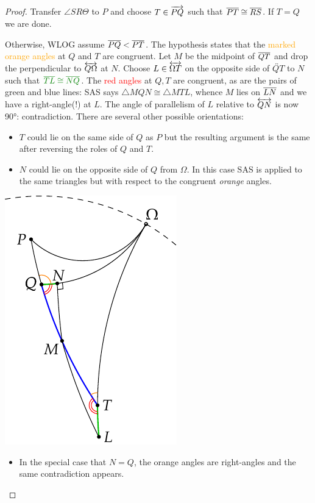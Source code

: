 \begin{proof}
Transfer $\angle SR\Theta$ to $P$ and choose $T\in\overrightarrow{PQ}$ such that $\overline{PT}\cong\overline{RS}$. If $T=Q$ we are done.\par
\begin{minipage}[t]{0.7\linewidth}\vspace{-5pt}
Otherwise, WLOG assume $\overline{PQ}<\overline{PT}$. The hypothesis states that the \textcolor{orange}{marked orange angles} at $Q$ and $T$ are congruent.\smallbreak
Let $M$ be the midpoint of $\overline{QT}$ and drop the perpendicular to $\overleftrightarrow{Q\Omega}$ at $N$.\smallbreak
Choose $L\in\overleftrightarrow{\Omega T}$ on the opposite side of $\overleftrightarrow{QT}$ to $N$ such that $\textcolor{Green}{\cl{TL}\cong\cl{NQ}}$.\smallbreak
The \textcolor{red}{red angles} at $Q,T$ are congruent, as are the pairs of green and blue lines: SAS says $\triangle MQN\cong\triangle MTL$, whence $M$ lies on $\overline{LN}$ and we have a right-angle(!) at $L$.\smallbreak
The angle of parallelism of $L$ relative to $\overleftrightarrow{QN}$ is now \ang{90}: contradiction.\medbreak
There are several other possible orientations:
\begin{itemize}\itemsep0pt
  \item $T$ could lie on the same side of $Q$ as $P$ but the resulting argument is the same after reversing the roles of $Q$ and $T$.
  \item $N$ could lie on the opposite side of $Q$ from $\Omega$. In this case SAS is applied to the same triangles but with respect to the congruent \emph{orange} angles.
\end{itemize}\vspace{-12pt}
\end{minipage}\begin{minipage}[t]{0.3\linewidth}\vspace{0pt}
\flushright\includegraphics{basic-ext3}
\end{minipage}\par
\begin{itemize}
  \item In the special case that $N=Q$, the orange angles are right-angles and the same contradiction appears.\qedhere
\end{itemize}
\end{proof}

